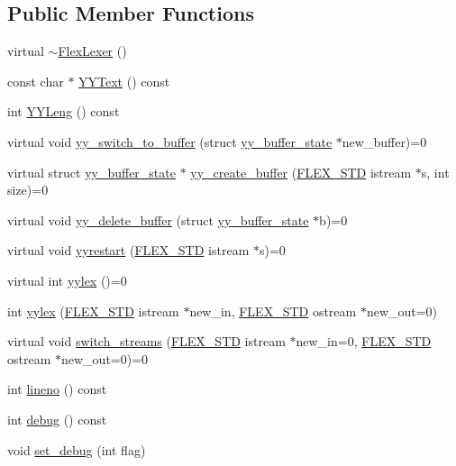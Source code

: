 \subsection*{Public Member Functions}
\begin{DoxyCompactItemize}
\item 
virtual \hyperlink{classFlexLexer_a513c4982ef52db6d43151becbf3fe05a}{$\sim$\+Flex\+Lexer} ()
\item 
const char $\ast$ \hyperlink{classFlexLexer_aefb1ea757e0e455ae229ae099b4240c2}{Y\+Y\+Text} () const
\item 
int \hyperlink{classFlexLexer_aad615c6bce162fcc98c07d69371f6117}{Y\+Y\+Leng} () const
\item 
virtual void \hyperlink{classFlexLexer_a3fa4649c1866a483fc391923ca90ca1d}{yy\+\_\+switch\+\_\+to\+\_\+buffer} (struct \hyperlink{structyy__buffer__state}{yy\+\_\+buffer\+\_\+state} $\ast$new\+\_\+buffer)=0
\item 
virtual struct \hyperlink{structyy__buffer__state}{yy\+\_\+buffer\+\_\+state} $\ast$ \hyperlink{classFlexLexer_a9e0d5e33726e0270b241a730a3028990}{yy\+\_\+create\+\_\+buffer} (\hyperlink{FlexLexer_8h_ae50ff830f34b9e244163babb41a1552d}{F\+L\+E\+X\+\_\+\+S\+TD} istream $\ast$s, int size)=0
\item 
virtual void \hyperlink{classFlexLexer_a6c59180ab84ba98af3704ba2cb018230}{yy\+\_\+delete\+\_\+buffer} (struct \hyperlink{structyy__buffer__state}{yy\+\_\+buffer\+\_\+state} $\ast$b)=0
\item 
virtual void \hyperlink{classFlexLexer_a15aea8e169874756674e4f79553e68ed}{yyrestart} (\hyperlink{FlexLexer_8h_ae50ff830f34b9e244163babb41a1552d}{F\+L\+E\+X\+\_\+\+S\+TD} istream $\ast$s)=0
\item 
virtual int \hyperlink{classFlexLexer_a1b1f93d24f5a97f50eb1747fac568ccb}{yylex} ()=0
\item 
int \hyperlink{classFlexLexer_a5ec7f8b71a9cd9142963f0d924ddaa7c}{yylex} (\hyperlink{FlexLexer_8h_ae50ff830f34b9e244163babb41a1552d}{F\+L\+E\+X\+\_\+\+S\+TD} istream $\ast$new\+\_\+in, \hyperlink{FlexLexer_8h_ae50ff830f34b9e244163babb41a1552d}{F\+L\+E\+X\+\_\+\+S\+TD} ostream $\ast$new\+\_\+out=0)
\item 
virtual void \hyperlink{classFlexLexer_a09dd0826a8540365a74c2167795bbc61}{switch\+\_\+streams} (\hyperlink{FlexLexer_8h_ae50ff830f34b9e244163babb41a1552d}{F\+L\+E\+X\+\_\+\+S\+TD} istream $\ast$new\+\_\+in=0, \hyperlink{FlexLexer_8h_ae50ff830f34b9e244163babb41a1552d}{F\+L\+E\+X\+\_\+\+S\+TD} ostream $\ast$new\+\_\+out=0)=0
\item 
int \hyperlink{classFlexLexer_a835d3243729ffa4912949ea44b241f3b}{lineno} () const
\item 
int \hyperlink{classFlexLexer_a71d0a4ad9db57c86b44e84c407eb21f1}{debug} () const
\item 
void \hyperlink{classFlexLexer_a1da05b19b783fd94e8a65cb4ee02dec8}{set\+\_\+debug} (int flag)
\end{DoxyCompactItemize}
